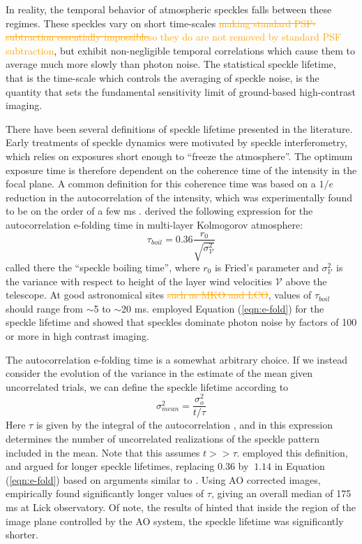 \documentclass[10pt,preprint]{aastex631}
\newcommand{\ogadd}[1]{\textcolor{orange}{#1}}
\newcommand{\ogrmv}[1]{\textcolor{orange}{\sout{#1}}}
\begin{document}
In reality, the temporal behavior of atmospheric speckles falls between these regimes. These speckles vary on short time-scales \ogrmv{making standard PSF-subtraction essentially impossible}\ogadd{so they do are not removed by standard PSF subtraction}, but exhibit non-negligible temporal correlations which cause them to average much more slowly than photon noise.  The statistical speckle lifetime, that is the time-scale which controls the averaging of speckle noise, is the quantity that sets the fundamental sensitivity limit of ground-based high-contrast imaging.

There have been several definitions of speckle lifetime presented in the literature.  Early treatments of speckle dynamics were motivated by speckle interferometry, which relies on exposures short enough to ``freeze the atmosphere''.  The optimum exposure time is therefore dependent on the coherence time of the intensity in the focal plane.  A common definition for this coherence time was based on a $1/e$ reduction in the autocorrelation of the intensity, which was experimentally found to be on the order of a few ms \citep{1978ApOpt..17.3779S,1990JMOp...37.1247D}.    \citet{1982JOpt...13..263R} derived the following expression for the autocorrelation e-folding time in multi-layer Kolmogorov atmosphere:
\begin{equation}
\tau_{boil} = 0.36 \frac{r_0}{\sqrt{\sigma^2_\mathcal{V}}}
\label{eqn:e-fold}
\end{equation}
called there the ``speckle boiling time'', where $r_0$ is Fried's parameter and $\sigma^2_\mathcal{V}$ is the variance with respect to height of the layer wind velocities $\mathcal{V}$  above the telescope.  At good astronomical sites \ogrmv{such as MKO and LCO}, values of $\tau_{boil}$ should range from $\sim$5 to $\sim$20 ms. \citet{1999PASP..111..587R} employed Equation (\ref{eqn:e-fold}) for the speckle lifetime and showed that speckles dominate photon noise by factors of 100 or more in high contrast imaging.

The autocorrelation e-folding time is a somewhat arbitrary choice.  If we instead consider the evolution of the variance in the estimate of the mean given uncorrelated trials, we can define the speckle lifetime according to
\begin{equation}
\sigma_{mean}^2 = \frac{\sigma_o^2}{t/\tau}
\label{eqn:varmean_def_intro}
\end{equation}
Here $\tau$ is given by the integral of the autocorrelation \citep{2006ApJ...637..541F}, and in this expression determines the number of uncorrelated realizations of the speckle pattern included in the mean.  Note that this assumes $t >> \tau$.  \citet{1986JOSAA...3.1001A} employed this definition, and argued for longer speckle lifetimes, replacing $0.36$ by $~$$1.14$ in Equation (\ref{eqn:e-fold}) based on arguments similar to \citet{1982JOpt...13..263R}.  Using AO corrected images, \citet{2006ApJ...637..541F} empirically found significantly longer values of $\tau$, giving an overall median of 175 ms at Lick observatory.  Of note, the results of \citet{2006ApJ...637..541F} hinted that inside the region of the image plane controlled by the AO system, the speckle lifetime was significantly shorter.
\end{document}
